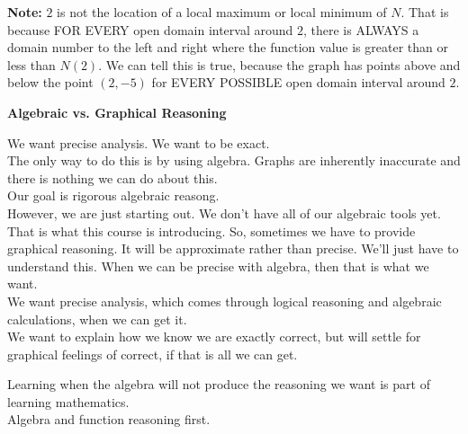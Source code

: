 \documentclass{ximera}
\begin{document}
\textbf{Note:} $2$ is not the location of a local maximum or local minimum of $N$.  That is because FOR EVERY open domain interval around $2$, there is ALWAYS a domain number to the left and right where the function value is greater than or less than $N(2)$.  We can tell this is true, because the graph has points above and below the point $(2, -5)$ for EVERY POSSIBLE open domain interval around $2$. \\













\begin{warning}  \textbf{\textcolor{red!70!black}{Algebraic vs. Graphical Reasoning}}


We want precise analysis.  We want to be exact. \\


The only way to do this is by using algebra.  Graphs are inherently inaccurate and there is nothing we can do about this. \\


Our goal is rigorous algebraic reasong. \\



However, we are just starting out.  We don't have all of our algebraic tools yet.  That is what this course is introducing.  So, sometimes we have to provide graphical reasoning.  It will be approximate rather than precise.  We'll just have to understand this.  When we can be precise with algebra, then that is what we want. \\


We want precise analysis, which comes through logical reasoning and algebraic calculations, when we can get it. \\


We want to explain how we know we are exactly correct, but will settle for graphical feelings of correct, if that is all we can get. \\


\end{warning}



Learning when the algebra will not produce the reasoning we want is part of learning mathematics.  \\

Algebra and function reasoning first. \\
\end{document}
